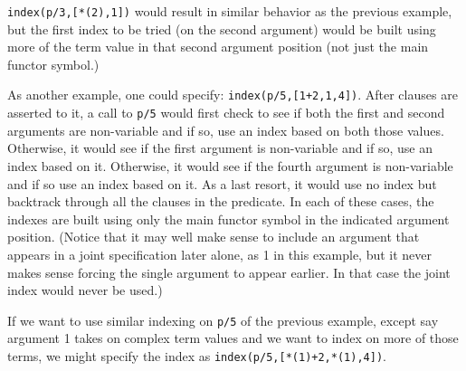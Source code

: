 \begin{description}
\begin{itemize}
\begin{itemize}
{\tt index(p/3,[*(2),1])} would result in similar behavior as the
previous example, but the first index to be tried (on the second
argument) would be built using more of the term value in that second
argument position (not just the main functor symbol.)

As another example, one could specify: {\tt index(p/5,[1+2,1,4])}.
After clauses are asserted to it, a call to {\tt p/5} would first
check to see if both the first and second arguments are non-variable
and if so, use an index based on both those values. Otherwise, it
would see if the first argument is non-variable and if so, use an
index based on it. Otherwise, it would see if the fourth argument is
non-variable and if so use an index based on it. As a last resort, it
would use no index but backtrack through all the clauses in the
predicate.  In each of these cases, the indexes are built using only
the main functor symbol in the indicated argument position. (Notice
that it may well make sense to include an argument that appears in a
joint specification later alone, as 1 in this example, but it never
makes sense forcing the single argument to appear earlier. In that
case the joint index would never be used.)

If we want to use similar indexing on {\tt p/5} of the previous
example, except say argument 1 takes on complex term values and we
want to index on more of those terms, we might specify the index as
{\tt index(p/5,[*(1)+2,*(1),4])}.

\end{itemize}


\end{itemize}
\end{description}

